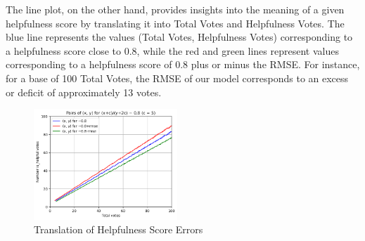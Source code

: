\noindent
The line plot, on the other hand, provides insights into the meaning of a given helpfulness score by translating it into Total 
Votes and Helpfulness Votes. The blue line represents the values (Total Votes, Helpfulness Votes) corresponding to a helpfulness 
score close to 0.8, while the red and green lines represent values corresponding to a helpfulness score of 0.8 plus or minus the RMSE. 
For instance, for a base of 100 Total Votes, the RMSE of our model corresponds to an excess or deficit of approximately 13 votes.

\begin{figure}[H]
    \centering
    \includegraphics[width=0.48\textwidth]{./figures/model_best_lines.png}
    \caption{Translation of Helpfulness Score Errors}
    \label{fig:model_best_lines}
\end{figure}





